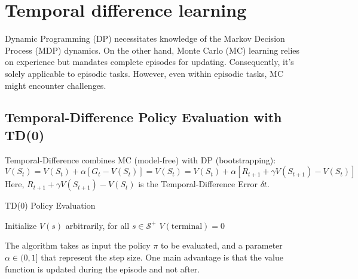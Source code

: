 \section{Temporal difference learning}

Dynamic Programming (DP) necessitates knowledge of the Markov Decision Process (MDP) dynamics. 
On the other hand, Monte Carlo (MC) learning relies on experience but mandates complete episodes for updating. 
Consequently, it's solely applicable to episodic tasks. 
However, even within episodic tasks, MC might encounter challenges.

\subsection{Temporal-Difference Policy Evaluation with TD(0)}
Temporal-Difference combines MC (model-free) with DP (bootstrapping):
\[V(S_t)=V(S_t)+\alpha[G_t-V(S_t)]=V(S_t)=V(S_t)+\alpha[R_{t+1}+\gamma V(S_{t+1})-V(S_t)]\]
Here, $R_{t+1}+\gamma V(S_{t+1})-V(S_t)$ is the Temporal-Difference Error $\delta t$. 
\begin{algorithm}[H]
    \caption{TD(0) Policy Evaluation}
        \begin{algorithmic}[1]
            \State Initialize $V(s)$ arbitrarily, for all $s\in\mathcal{S}^{+}$
            \State $V(\text{terminal})=0$
            \EndFor
        \end{algorithmic}
\end{algorithm}
The algorithm takes as input the policy $\pi$ to be evaluated, and a parameter $\alpha\in(0,1]$ that represent the step size. 
One main advantage is that the value function is updated during the episode and not after. 

